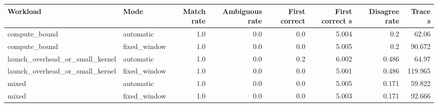 \begin{tabular}{llrrrrrr}
\hline
Workload & Mode & Match rate & Ambiguous rate & First correct & First correct s & Disagree rate & Trace s \\
\hline
compute_bound & automatic & 1.0 & 0.0 & 0.0 & 5.004 & 0.2 & 62.06 \\
compute_bound & fixed_window & 1.0 & 0.0 & 0.0 & 5.005 & 0.2 & 90.672 \\
launch_overhead_or_small_kernel & automatic & 1.0 & 0.0 & 0.2 & 6.002 & 0.486 & 64.97 \\
launch_overhead_or_small_kernel & fixed_window & 1.0 & 0.0 & 0.0 & 5.001 & 0.486 & 119.965 \\
mixed & automatic & 1.0 & 0.0 & 0.0 & 5.005 & 0.171 & 59.822 \\
mixed & fixed_window & 1.0 & 0.0 & 0.0 & 5.003 & 0.171 & 92.666 \\
\hline
\end{tabular}
